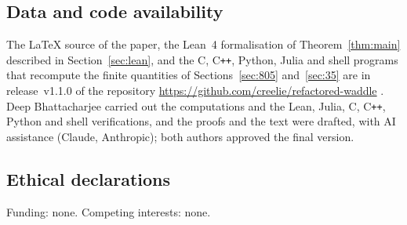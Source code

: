 \documentclass{amsart}
\theoremstyle{definition}
\theoremstyle{remark}
\numberwithin{equation}{section}
\begin{document}
\subsection*{Data and code availability}
\begingroup\raggedright
The \LaTeX{} source of the paper, the Lean~4 formalisation of Theorem~\ref{thm:main} described in Section~\ref{sec:lean}, and the C, C\texttt{++}, Python, Julia and shell programs that recompute the finite quantities of Sections~\ref{sec:805} and~\ref{sec:35} are in release~v1.1.0 of the repository \url{https://github.com/creelie/refactored-waddle} \cite{archive}. Deep Bhattacharjee carried out the computations and the Lean, Julia, C, C\texttt{++}, Python and shell verifications, and the proofs and the text were drafted, with AI assistance (Claude, Anthropic); both authors approved the final version.\par
\endgroup

\subsection*{Ethical declarations}
Funding: none. Competing interests: none.
\end{document}
